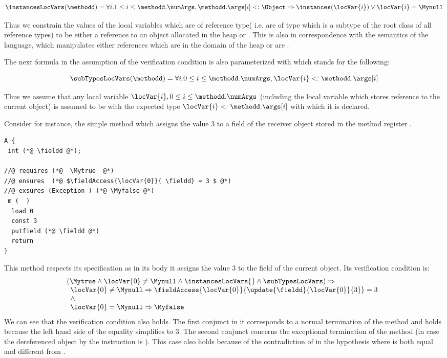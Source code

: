 $$ \instancesLocVars(\methodd)  =  \forall i.
 1 \le i \le \methodd.\numArgs,  \methodd. \args[i] <: \Object \Rightarrow  \instances( \locVar{i} )
  \vee \locVar{i} = \Mynull
$$

Thus we constrain the values of the local variables which are of reference
type( i.e. are of type which is a subtype  of the root class \Object{} of all
reference types) to be either a reference to an object allocated in the
heap or \Mynull. This is also in correspondence with the semantics of the
language, which manipulates either references which are in the domain
of the heap or are \Mynull.

The next formula in the assumption of the verification condition is
\instancesLocVars{} also parameterized with \methodd{} which stands for the
following:

$$ \subTypesLocVars (\methodd)  =  \forall i.
 0 \le i \le \methodd.\numArgs,  \locVar{i} <: \methodd. \args[i]
$$

Thus we assume that any local variable $\locVar{i}, 0 \le i \le \methodd.\numArgs$ 
 (including the local variable  which stores reference to the current
object) is assumed to be with the expected type $\locVar{i} <: \methodd. \args[i]$  with which it is declared.

Consider for instance, the simple method which assigns the value 3
to a field \fieldd{} of the receiver object stored in the method register
.  
\begin{lstlisting}[frame=trbl]
A {
 int (*@ \fieldd @*);

//@ requires (*@  \Mytrue  @*)
//@ ensures  (*@ $\fieldAccess{\locVar{0}}{ \fieldd} = 3 $ @*)
//@ exsures (Exception ) (*@ \Myfalse @*)
 m (  )
  load 0
  const 3 
  putfield (*@ \fieldd @*)
  return
} 
\end{lstlisting}

This method respects its specification as in its body it assigns the value 3
to the field \fieldd{} of the current object. Its verification condition is:  
$$  \begin{array}{l} (\Mytrue  \wedge \locVar{0} \neq \Mynull   \wedge
  \instancesLocVars{} \wedge \subTypesLocVars  ) \Rightarrow\\   
  \begin{array}{l}
 \locVar{0} \neq \Mynull \Rightarrow \fieldAccess{\locVar{0}}{\update{
  \fieldd}{\locVar{0} } {3}} = 3 \\ 
  \wedge \\
\locVar{0} = \Mynull \Rightarrow \Myfalse 
\end{array}  \end{array}
  $$
We can see that the verification condition also holds. The first conjunct in it
 corresponds to a normal termination of the method 
and holds because the left hand side of the equality simplifies to 3. The
second conjunct concerns the exceptional termination of the method (in case the
dereferenced object by the instruction \putfield{} is  \Mynull). This case
also holds because of the contradiction of in the hypothesis where 
is both  equal and different from \Mynull.


